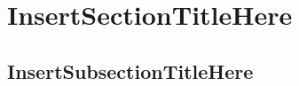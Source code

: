 


	
	
	\tableofcontents
	\lstlistoflistings
	\listoffigures
	\newpage
	
	\section{InsertSectionTitleHere}
	\subsection{InsertSubsectionTitleHere}

	\newpage
	\printbibliography[title={Bibliography},heading=bibintoc]
	

